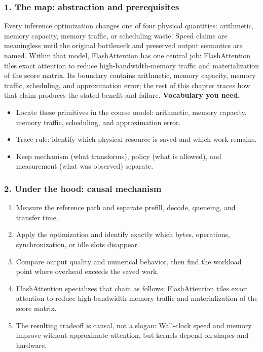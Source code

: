 \subsubsection*{1. The map: abstraction and prerequisites}
Every inference optimization changes one of four physical quantities: arithmetic, memory capacity, memory traffic, or scheduling waste. Speed claims are meaningless until the original bottleneck and preserved output semantics are named.
Within that model, FlashAttention has one central job: FlashAttention tiles exact attention to reduce high-bandwidth-memory traffic and materialization of the score matrix. Its boundary contains arithmetic, memory capacity, memory traffic, scheduling, and approximation error; the rest of this chapter traces how that claim produces the stated benefit and failure.
\textbf{Vocabulary you need.}\begin{itemize}
\item Locate these primitives in the course model: arithmetic, memory capacity, memory traffic, scheduling, and approximation error.
\item Trace rule: identify which physical resource is saved and which work remains.
\item Keep mechanism (what transforms), policy (what is allowed), and measurement (what was observed) separate.
\end{itemize}
\subsubsection*{2. Under the hood: causal mechanism}\begin{enumerate}
\item Measure the reference path and separate prefill, decode, queueing, and transfer time.
\item Apply the optimization and identify exactly which bytes, operations, synchronization, or idle slots disappear.
\item Compare output quality and numerical behavior, then find the workload point where overhead exceeds the saved work.
\item FlashAttention specializes that chain as follows: FlashAttention tiles exact attention to reduce high-bandwidth-memory traffic and materialization of the score matrix.
\item The resulting tradeoff is causal, not a slogan: Wall-clock speed and memory improve without approximate attention, but kernels depend on shapes and hardware.
\end{enumerate}
